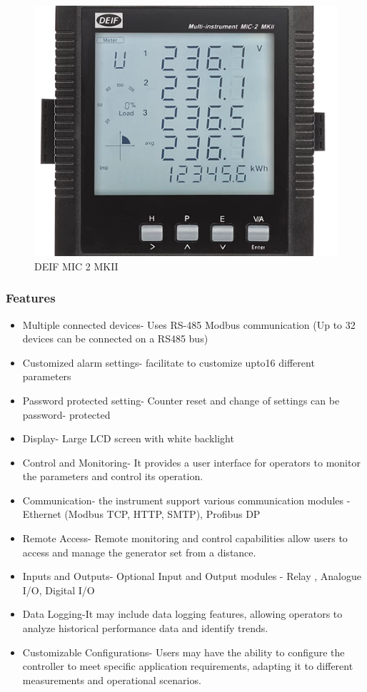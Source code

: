 		\begin{figure}[H]
			\centering
			\includegraphics[width=0.6\linewidth]{assets/MS-deif.png}
			\caption{DEIF MIC 2 MKII~\cite{deif-mk2}}
			\label{fig:deif-mic-mk2}
		\end{figure}
		
		\subsubsection*{Features}
			\begin{itemize}
				\item Multiple connected devices- Uses RS-485 Modbus communication (Up to 32 devices
				can be connected on a RS485 bus)
				\item Customized alarm settings- facilitate to customize upto16 different parameters
				\item Password protected setting- Counter reset and change of settings can be password-
				protected
				\item Display- Large LCD screen with white backlight
				\item Control and Monitoring- It provides a user interface for operators to monitor the
				parameters and control its operation.
				\item Communication- the instrument support various communication modules - Ethernet
				(Modbus TCP, HTTP, SMTP), Profibus DP
				\item Remote Access- Remote monitoring and control capabilities allow users to access and
				manage the generator set from a distance.
				\item Inputs and Outputs- Optional Input and Output modules - Relay , Analogue I/O,
				Digital I/O
				\item Data Logging-It may include data logging features, allowing operators to analyze
				historical performance data and identify trends.
				\item Customizable Configurations- Users may have the ability to configure the controller to
				meet specific application requirements, adapting it to different measurements and
				operational scenarios.
			\end{itemize}
	
	
